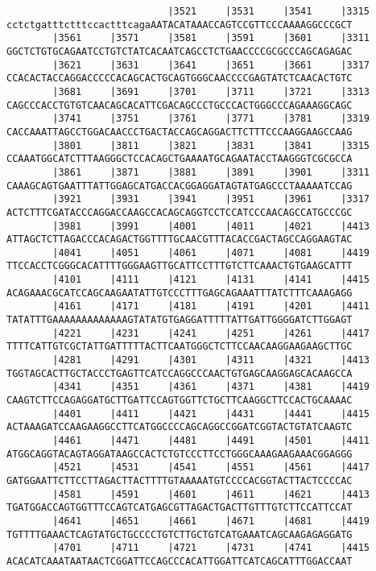 \documentclass{article}
\begin{document}
\begin{Verbatim}
                            |3521     |3531     |3541     |3315
cctctgatttctttccactttcagaAATACATAAACCAGTCCGTTCCCAAAAGGCCCGCT
        |3561     |3571     |3581     |3591     |3601     |3311
GGCTCTGTGCAGAATCCTGTCTATCACAATCAGCCTCTGAACCCCGCGCCCAGCAGAGAC
        |3621     |3631     |3641     |3651     |3661     |3317
CCACACTACCAGGACCCCCACAGCACTGCAGTGGGCAACCCCGAGTATCTCAACACTGTC
        |3681     |3691     |3701     |3711     |3721     |3313
CAGCCCACCTGTGTCAACAGCACATTCGACAGCCCTGCCCACTGGGCCCAGAAAGGCAGC
        |3741     |3751     |3761     |3771     |3781     |3319
CACCAAATTAGCCTGGACAACCCTGACTACCAGCAGGACTTCTTTCCCAAGGAAGCCAAG
        |3801     |3811     |3821     |3831     |3841     |3315
CCAAATGGCATCTTTAAGGGCTCCACAGCTGAAAATGCAGAATACCTAAGGGTCGCGCCA
        |3861     |3871     |3881     |3891     |3901     |3311
CAAAGCAGTGAATTTATTGGAGCATGACCACGGAGGATAGTATGAGCCCTAAAAATCCAG
        |3921     |3931     |3941     |3951     |3961     |3317
ACTCTTTCGATACCCAGGACCAAGCCACAGCAGGTCCTCCATCCCAACAGCCATGCCCGC
        |3981     |3991     |4001     |4011     |4021     |4413
ATTAGCTCTTAGACCCACAGACTGGTTTTGCAACGTTTACACCGACTAGCCAGGAAGTAC
        |4041     |4051     |4061     |4071     |4081     |4419
TTCCACCTCGGGCACATTTTGGGAAGTTGCATTCCTTTGTCTTCAAACTGTGAAGCATTT
        |4101     |4111     |4121     |4131     |4141     |4415
ACAGAAACGCATCCAGCAAGAATATTGTCCCTTTGAGCAGAAATTTATCTTTCAAAGAGG
        |4161     |4171     |4181     |4191     |4201     |4411
TATATTTGAAAAAAAAAAAAAGTATATGTGAGGATTTTTATTGATTGGGGATCTTGGAGT
        |4221     |4231     |4241     |4251     |4261     |4417
TTTTCATTGTCGCTATTGATTTTTACTTCAATGGGCTCTTCCAACAAGGAAGAAGCTTGC
        |4281     |4291     |4301     |4311     |4321     |4413
TGGTAGCACTTGCTACCCTGAGTTCATCCAGGCCCAACTGTGAGCAAGGAGCACAAGCCA
        |4341     |4351     |4361     |4371     |4381     |4419
CAAGTCTTCCAGAGGATGCTTGATTCCAGTGGTTCTGCTTCAAGGCTTCCACTGCAAAAC
        |4401     |4411     |4421     |4431     |4441     |4415
ACTAAAGATCCAAGAAGGCCTTCATGGCCCCAGCAGGCCGGATCGGTACTGTATCAAGTC
        |4461     |4471     |4481     |4491     |4501     |4411
ATGGCAGGTACAGTAGGATAAGCCACTCTGTCCCTTCCTGGGCAAAGAAGAAACGGAGGG
        |4521     |4531     |4541     |4551     |4561     |4417
GATGGAATTCTTCCTTAGACTTACTTTTGTAAAAATGTCCCCACGGTACTTACTCCCCAC
        |4581     |4591     |4601     |4611     |4621     |4413
TGATGGACCAGTGGTTTCCAGTCATGAGCGTTAGACTGACTTGTTTGTCTTCCATTCCAT
        |4641     |4651     |4661     |4671     |4681     |4419
TGTTTTGAAACTCAGTATGCTGCCCCTGTCTTGCTGTCATGAAATCAGCAAGAGAGGATG
        |4701     |4711     |4721     |4731     |4741     |4415
ACACATCAAATAATAACTCGGATTCCAGCCCACATTGGATTCATCAGCATTTGGACCAAT

\end{Verbatim}
\end{document}
